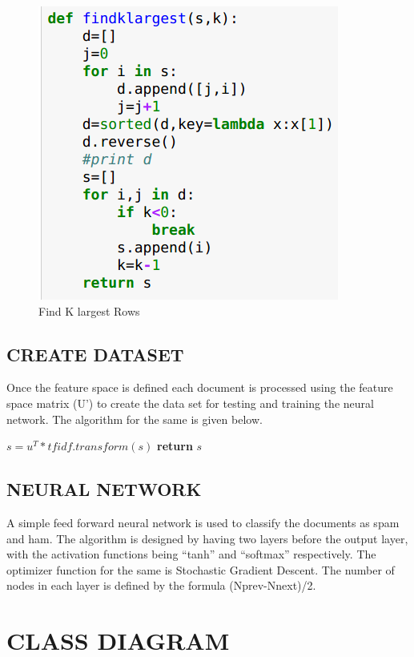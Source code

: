 \begin{figure}[h]
\centering\includegraphics[width=0.6\linewidth]{findk.png}
\caption{Find K largest Rows}
\end{figure}

\subsection{CREATE DATASET}
Once the feature space is defined each document is processed using the feature space matrix (U’) to create the data set for testing and training the neural network. The algorithm for the same is given below.

\begin{algorithm}
\caption\textbf{{Creating Data Set}}
\begin{algorithmic}[1]
\Procedure{}
\State $s=u^T*tfidf.transform(s)$
\State \textbf{return} $s$
\EndProcedure
\end{algorithmic}
\end{algorithm}

\subsection{NEURAL NETWORK}
A simple feed forward neural network is used to classify the documents as spam and ham. The algorithm is designed by having two layers before the output layer, with the activation functions being “tanh” and “softmax” respectively. The optimizer function for the same is Stochastic Gradient Descent. 
The number of nodes in each layer is defined by the formula (Nprev-Nnext)/2.  

\section{CLASS DIAGRAM}

